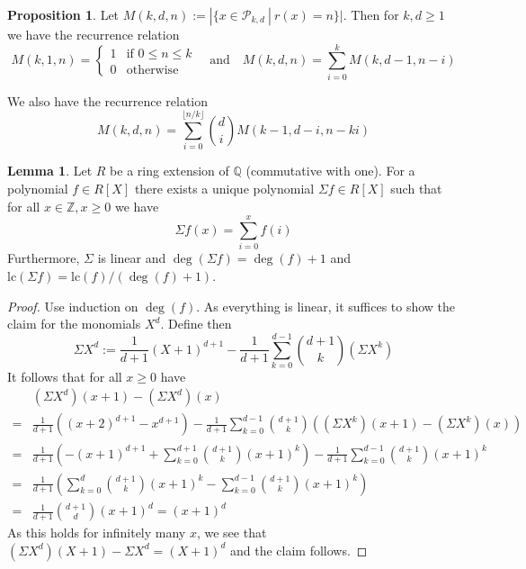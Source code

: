 \documentclass{scrartcl}
\newcommand{\Z}{\mathbb{Z}}
\newcommand{\Q}{\mathbb{Q}}
\theoremstyle{definition}
\newtheorem{lemma}[definition]{Lemma}
\newtheorem{proposition}[definition]{Proposition}
\begin{document}
\begin{proposition}
    Let $M(k, d, n) := |\{ x \in \mathcal{P}_{k, d} \ | \ r(x) = n\}|$. Then for $k, d \geq 1$ we have the recurrence relation
    \begin{equation*}
        M(k, 1, n) = \begin{cases}
            1 & \text{if $0 \leq n \leq k$} \\
            0 & \text{otherwise}
        \end{cases}
        \quad \text{and} \quad
        M(k, d, n) = \sum_{i = 0}^k M(k, d - 1, n - i)
    \end{equation*}

    We also have the recurrence relation
    \begin{equation*}
        M(k, d, n) = \sum_{i = 0}^{\lfloor n/k \rfloor} {d \choose i} M(k - 1, d - i, n - ki)
    \end{equation*}
\end{proposition}
\begin{lemma}
    Let $R$ be a ring extension of $\Q$ (commutative with one). 
    For a polynomial $f \in R[X]$ there exists a unique polynomial $\Sigma f \in R[X]$ such that for all $x \in \Z, x \geq 0$ we have
    \begin{equation*}
        \Sigma f(x) = \sum_{i = 0}^x f(i)
    \end{equation*}
    Furthermore, $\Sigma$ is linear and $\deg(\Sigma f) = \deg(f) + 1$ and $\mathrm{lc}(\Sigma f) = \mathrm{lc}(f) / (\deg(f) + 1)$.
\end{lemma}
\begin{proof}
    Use induction on $\deg(f)$.
    As everything is linear, it suffices to show the claim for the monomials $X^d$.
    Define then
    \begin{equation*}
        \Sigma X^d := \frac 1 {d + 1} (X + 1)^{d + 1} - \frac 1 {d + 1} \sum_{k = 0}^{d - 1} {d + 1 \choose k} \left( \Sigma X^k \right)
    \end{equation*}
    It follows that for all $x \geq 0$ have
    \begin{align*}
        &\left( \Sigma X^d \right)(x + 1) - \left( \Sigma X^d \right)(x) \\
        =& \frac 1 {d + 1} \left( (x + 2)^{d + 1} - x^{d + 1} \right) - \frac 1 {d + 1} \sum_{k = 0}^{d - 1} {d + 1 \choose k} \left( \left( \Sigma X^k \right)(x + 1) - \left( \Sigma X^k \right)(x) \right) \\
        =& \frac 1 {d + 1} \left( -(x + 1)^{d + 1} + \sum_{k = 0}^{d + 1} {d + 1 \choose k} (x + 1)^k \right) - \frac 1 {d + 1} \sum_{k = 0}^{d - 1} {d + 1 \choose k} (x + 1)^k \\
        =& \frac 1 {d + 1} \left( \sum_{k = 0}^d {d + 1 \choose k} (x + 1)^k - \sum_{k = 0}^{d - 1} {d + 1 \choose k} (x + 1)^k \right) \\
        =& \frac 1 {d + 1} {d + 1 \choose d} (x + 1)^d = (x + 1)^d
    \end{align*}
    As this holds for infinitely many $x$, we see that $(\Sigma X^d)(X + 1) - \Sigma X^d = (X + 1)^d$ and the claim follows.
\end{proof}
\end{document}
